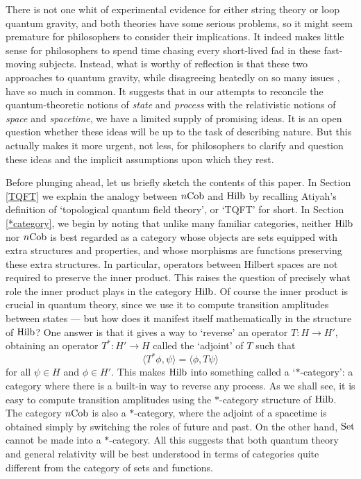 \documentclass{article}
\newcommand{\Set}{{\rm Set}}
\newcommand{\Hilb}{{\rm Hilb}}
\newcommand{\Cob}{{\rm Cob}}
\renewcommand{\to}{\rightarrow}
\newcommand{\maps}{\colon}
\begin{document}
There is not one whit of experimental evidence for either string
theory or loop quantum gravity, and both theories have some
serious problems, so it might seem premature for philosophers to 
consider their implications.  It
indeed makes little sense for philosophers to spend time chasing every
short-lived fad in these fast-moving subjects.  Instead, what is
worthy of reflection is that these two approaches to quantum gravity,
while disagreeing heatedly on so many issues \cite{Smolin,Vaas}, have
so much in common.  It suggests that in our attempts to reconcile the
quantum-theoretic notions of {\it state} and {\it process} with the
relativistic notions of {\it space} and {\it spacetime}, we have a
limited supply of promising ideas.  It is an open question whether
these ideas will be up to the task of describing nature.  But this
actually makes it more urgent, not less, for philosophers to clarify
and question these ideas and the implicit assumptions upon which they
rest.

Before plunging ahead, let us briefly sketch the contents of this
paper.  In Section \ref{TQFT} we explain the analogy between $n\Cob$
and $\Hilb$ by recalling Atiyah's definition of `topological quantum
field theory', or `TQFT' for short.  In Section \ref{*category}, we
begin by noting that unlike many familiar categories, neither $\Hilb$
nor $n\Cob$ is best regarded as a category whose objects are sets
equipped with extra structures and properties, and whose morphisms are
functions preserving these extra structures.  In particular, operators
between Hilbert spaces are not required to preserve the inner product.
This raises the question of precisely what role the inner product
plays in the category $\Hilb$.  Of course the inner product is crucial
in quantum theory, since we use it to compute transition amplitudes
between states --- but how does it manifest itself mathematically in the
structure of $\Hilb$?  One answer is that it gives a way to `reverse'
an operator $T \maps H \to H'$, obtaining an operator 
$T^\ast \maps H' \to H$ called the `adjoint' of $T$ such that
\[   \langle T^\ast \phi,\psi \rangle = \langle \phi, T\psi \rangle \]
for all $\psi \in H$ and $\phi \in H'$.
This makes $\Hilb$ into something called a `$\ast$-category': a
category where there is a built-in way to reverse any process.  As we
shall see, it is easy to compute transition amplitudes using the
$\ast$-category structure of $\Hilb$.  The category $n\Cob$
is also a $\ast$-category, where the adjoint of a spacetime is
obtained simply by switching the roles of future and past.  On the
other hand, $\Set$ cannot be made into a $\ast$-category.  All this
suggests that both quantum theory and general relativity will be best
understood in terms of categories quite different from the category of
sets and functions.
 
\end{document}
